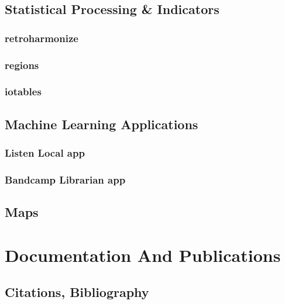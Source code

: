 \documentclass[
  fontsize=13pt,
  english,
  a4paper,
  openany, a4paper, oneside]{book}
\begin{document}
\hypertarget{statistical-software}{%
\section{Statistical Processing \& Indicators}\label{statistical-software}}

\hypertarget{retroharmonize}{%
\subsection{retroharmonize}\label{retroharmonize}}

\hypertarget{regions}{%
\subsection{regions}\label{regions}}

\hypertarget{iotables}{%
\subsection{iotables}\label{iotables}}

\hypertarget{machine-learning}{%
\section{Machine Learning Applications}\label{machine-learning}}

\hypertarget{listen-local}{%
\subsection{Listen Local app}\label{listen-local}}

\hypertarget{bandcamp-librarian}{%
\subsection{Bandcamp Librarian app}\label{bandcamp-librarian}}

\hypertarget{maps}{%
\section{Maps}\label{maps}}

\hypertarget{documentation}{%
\chapter{Documentation And Publications}\label{documentation}}

\hypertarget{bibliography}{%
\section{Citations, Bibliography}\label{bibliography}}
\end{document}
